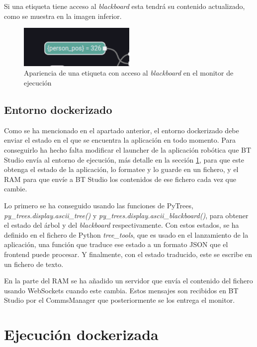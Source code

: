 Si una etiqueta tiene acceso al \textit{blackboard} esta tendrá su contenido actualizado, como se muestra en la imagen inferior.

\begin{figure}[H]
    \centering
    \includegraphics[width=0.5\textwidth]{figures/bt-avances/bt-tag-monit.png}
    \caption{Apariencia de una etiqueta con acceso al \textit{blackboard} en el monitor de ejecución}
    \label{fig:bt-tag-monit}
\end{figure}

\subsection{Entorno dockerizado}

Como se ha mencionado en el apartado anterior, el entorno dockerizado debe enviar el estado en el que se encuentra la aplicación en todo momento. Para conseguirlo ha hecho falta modificar el launcher de la aplicación robótica que BT Studio envía al entorno de ejecución, más detalle en la sección \ref{bt-studio:ejecutor}, para que este obtenga el estado de la aplicación, lo formatee y lo guarde en un fichero, y el RAM para que envíe a BT Studio los contenidos de ese fichero cada vez que cambie.

Lo primero se ha conseguido usando las funciones de PyTrees, \textit{py\_trees.display.ascii\_tree()} y \textit{py\_trees.display.ascii\_blackboard()}, para obtener el estado del árbol y del \textit{blackboard} respectivamente. Con estos estados, se ha definido en el fichero de Python \textit{tree\_tools}, que es usado en el lanzamiento de la aplicación, una función que traduce ese estado a un formato JSON que el frontend puede procesar. Y finalmente, con el estado traducido, este se escribe en un fichero de texto.

En la parte del RAM se ha añadido un servidor que envía el contenido del fichero usando WebSockets cuando este cambia. Estos mensajes son recibidos en BT Studio por el CommsManager que posteriormente se los entrega el monitor.

\section{Ejecución dockerizada}\label{bt-studio:ejecutor}

